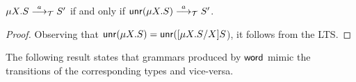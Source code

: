 

\begin{lemma}
  \label{lemma:unravelling}
  $\mu X. S \LTSderives[a] S'$ if and only if $\Unravel (\mu X. S) \LTSderives[a] S'$.
\end{lemma}
%
\begin{proof}
	Observing that $\Unravel(\mu X. S) = \Unravel(\subs{\mu X.S}{X}{S}$),
	it follows from the LTS.
\end{proof}

%

The following result states that grammars produced by
$\word$ mimic the transitions of the corresponding types
and vice-versa.

\newcommand{\grmcontext}{
  $(\vec X, \productions') = \grm(S, \emptyset)$ and 
  $(\vec Y, \productions) = \grm(T, \productions')$%
}

